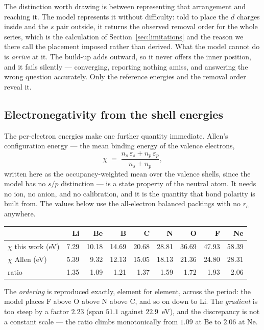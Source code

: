 \documentclass[11pt]{article}
\begin{document}
The distinction worth drawing is between representing that arrangement and reaching it. The
model represents it without difficulty: told to place the $d$ charges inside and the $s$ pair
outside, it returns the observed removal order for the whole series, which is the calculation
of Section~\ref{sec:limitations} and the reason we there call the placement imposed rather than
derived. What the model cannot do is \emph{arrive} at it. The build-up adds outward, so it
never offers the inner position, and it fails silently --- converging, reporting nothing amiss,
and answering the wrong question accurately. Only the reference energies and the removal order
reveal it.

\subsection{Electronegativity from the shell energies}\label{sec:chi}

The per-electron energies make one further quantity immediate. Allen's configuration
energy --- the mean binding energy of the valence electrons,
\begin{equation}\label{eq:chi}
\chi \;=\; \frac{n_s\,\varepsilon_s + n_p\,\varepsilon_p}{n_s+n_p},
\end{equation}
written here as the occupancy-weighted mean over the valence shells, since the model has
no $s/p$ distinction --- is a state property of the neutral atom. It needs no ion, no
anion, and no calibration, and it is the quantity that bond polarity is built from. The
values below use the all-electron balanced packings with no $r_c$ anywhere.

\begin{center}\footnotesize
\begin{tabular}{lrrrrrrrr}
\toprule
 & Li & Be & B & C & N & O & F & Ne \\
\midrule
$\chi$ this work (eV) & 7.29 & 10.18 & 14.69 & 20.68 & 28.81 & 36.69 & 47.93 & 58.39 \\
$\chi$ Allen (eV)     & 5.39 &  9.32 & 12.13 & 15.05 & 18.13 & 21.36 & 24.80 & 28.31 \\
ratio                 & 1.35 &  1.09 &  1.21 &  1.37 &  1.59 &  1.72 &  1.93 &  2.06 \\
\bottomrule
\end{tabular}
\end{center}

\noindent The \emph{ordering} is reproduced exactly, element for element, across the
period: the model places F above O above N above C, and so on down to Li. The
\emph{gradient} is too steep by a factor $2.23$ (span $51.1$ against $22.9$~eV), and the
discrepancy is not a constant scale --- the ratio climbs monotonically from $1.09$ at Be
to $2.06$ at Ne.
\end{document}
